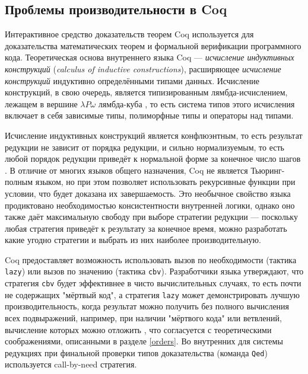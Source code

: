 \documentclass[../thesis.tex]{subfiles}
\begin{document}
\subsection{Проблемы производительности в Coq} \label{coq_problems}

Интерактивное средство доказательств теорем Coq используется для доказательства математических теорем и формальной верификации программного кода. Теоретическая основа внутреннего языка Coq --- \textit{исчисление индуктивных конструкций} (\textit{calculus of inductive constructions}), расширяющее \textit{исчисление конструкций} индуктивно определёнными типами данных. Исчисление конструкций, в свою очередь, является типизированным лямбда-исчислением, лежащем в вершине $\lambda P \omega$ лямбда-куба \cite{lambdacube}, то есть система типов этого исчисления включает в себя зависимые типы, полиморфные типы и операторы над типами. 

Исчисление индуктивных конструкций является конфлюэнтным, то есть результат редукции не зависит от порядка редукции, и сильно нормализуемым, то есть любой порядок редукции приведёт к нормальной форме за конечное число шагов \cite{cic_proofs}. В отличие от многих языков общего назначения, Coq не является Тьюринг-полным языком, но при этом позволяет использовать рекурсивные функции при условии, что будет доказана их завершаемость. Это необычное свойство языка продиктовано необходимостью консистентности внутренней логики, однако оно также даёт максимальную свободу при выборе стратегии редукции --- поскольку любая стратегия приведёт к результату за конечное время, можно разработать какие угодно стратегии и выбрать из них наиболее производительную.

Coq предоставляет возможность использовать вызов по необходимости (тактика \\\texttt{lazy}) или вызов по значению (тактика \texttt{cbv}). Разработчики языка утверждают, что стратегия \texttt{cbv} будет эффективнее в чисто вычислительных случаях, то есть почти не содержащих "мёртвый код", а стратегия \texttt{lazy} может демонстрировать лучшую производительность, когда результат можно получить без полного вычисления всех подвыражений, например, при наличии "мёртвого кода" или ветвлений, вычисление которых можно отложить \cite{coq}, что согласуется с теоретическими соображениями, описанными в разделе \ref{orders}. Во внутренних для системы редукциях при финальной проверки типов доказательства (команда \texttt{Qed}) используется call-by-need стратегия.
\end{document}

